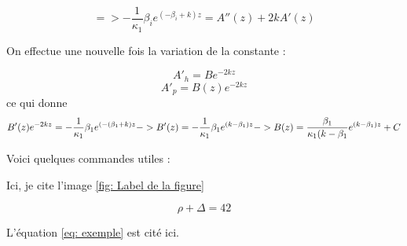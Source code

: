 \documentclass{rapportECC}
\begin{document}
\begin{equation*}
            => - \frac{1}{\kappa_1}\beta_i e^{(-\beta_i + k)z} = A''(z) + 2k A'(z)
\end{equation*}

On effectue une nouvelle fois la variation de la constante :

\begin{equation*}
    A'_h = B e^{-2kz}
\end{equation*}
\begin{equation*}
    A'_p = B(z) e^{-2kz}
\end{equation*}
ce qui donne
\begin{equation*}
   B'(z)e^{-2kz} = -\frac{1}{\kappa_1}\beta_1 e^{(-(\beta_1+k)z}\\
   -> B'(z) = -\frac{1}{\kappa_1}\beta_1 e^{(k-\beta_1)z}
   -> B(z) = \frac{\beta_1}{\kappa_1(k-\beta_1}e^{(k-\beta_1)z} + C
\end{equation*}





























Voici quelques commandes utiles : \cite{Lamport}


Ici, je cite l'image \ref{fig: Label de la figure}



\begin{equation} \label{eq: exemple}
\rho + \Delta = 42
\end{equation}

L'équation \ref{eq: exemple} est cité ici. 

\end{document}
